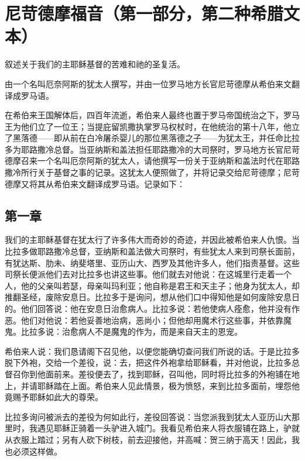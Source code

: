 \section{尼苛德摩福音（第一部分，第二种希腊文本）}

叙述关于我们的主耶稣基督的苦难和祂的圣复活。\par

由一个名叫厄奈阿斯的犹太人撰写，并由一位罗马地方长官尼苛德摩从希伯来文翻译成罗马语。\par

在希伯来王国解体后，四百年流逝，希伯来人最终也置于罗马帝国统治之下，罗马王为他们立了一位王；当提庇留凯撒执掌罗马权杖时，在他统治的第十八年，他立了黑落德——即从前在白冷屠杀婴儿的那位黑落德之子——为犹太王，并任命比拉多为耶路撒冷总督。当亚纳斯和盖法担任耶路撒冷的大司祭时，罗马地方长官尼苛德摩召来一个名叫厄奈阿斯的犹太人，请他撰写一份关于亚纳斯和盖法时代在耶路撒冷所行关于基督之事的记录。这犹太人便照做了，并将记录交给尼苛德摩；尼苛德摩又将其从希伯来文翻译成罗马语。记录如下：\par


\subsection{第一章}

我们的主耶稣基督在犹太行了许多伟大而奇妙的奇迹，并因此被希伯来人仇恨。当比拉多做耶路撒冷总督，亚纳斯和盖法做大司祭时，有些犹太人来到司祭长面前，有犹达斯、肋未、纳斐塔里、亚历山大、西罗及其他许多人，他们指责基督。这些司祭长便派他们去对比拉多也讲这些事。他们就去对他说：在这城里行走着一个人，他的父亲叫若瑟，母亲叫玛利亚；他自称是君王和天主子；他身为犹太人，却推翻圣经，废除安息日。比拉多于是询问，想从他们口中得知他是如何废除安息日的。他们回答说：他在安息日治愈病人。比拉多说：若他使病人痊愈，他并没有作恶。他们对他说：若他妥善地治病，恶尚小；但他却用魔术行这些事，并依靠魔鬼。比拉多说：治愈病人不是魔鬼的作为，而是来自天主的恩宠。\par

希伯来人说：我们恳请阁下召见他，以便您能确切查问我们所说的话。于是比拉多脱下外袍，交给一个差役，说：去，把这件外袍拿给耶稣看，并对他说，比拉多总督召你到他面前来。差役便去了，找到耶稣，召叫他，同时将比拉多的外袍铺在地上，并请耶稣踏在上面。希伯来人见此情景，极为愤怒，来到比拉多面前，埋怨他竟赐予耶稣如此大的尊荣。\par

比拉多询问被派去的差役为何如此行，差役回答说：当您派我到犹太人亚历山大那里时，我遇见耶稣正骑着一头驴进入城门。我看见希伯来人将衣服铺在路上，驴就从衣服上踏过；另有人砍下树枝，前去迎接他，并高喊：贺三纳于高天！因此，我也必须这样做。\par

